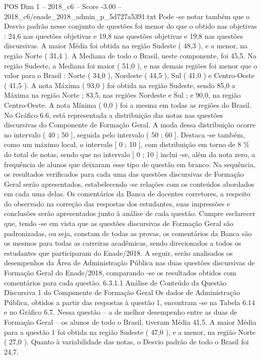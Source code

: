\begin{textsample}{POS Dim 1 – 2018\_c6 – Score -3.00 – 2018\_c6/enade\_2018\_admin\_p\_5d727a5391.txt}
Pode -se notar também que o Desvio padrão nesse conjunto de questões foi menor do que o obtido nas objetivas : 24,6 nas questões objetivas e 19,8 nas questões objetivas e 19,8 nas questões discursivas.
A maior Média foi obtida na região Sudeste ( 48,3 ), e a menor, na região Norte ( 31,4 ).
A Mediana de todo o Brasil, neste componente, foi 45,5.
Na região Sudeste, a Mediana foi maior ( 51,0 ), e nas demais regiões foi menor que o valor para o Brasil : Norte ( 34,0 ), Nordeste ( 44,5 ), Sul ( 41,0 ) e Centro-Oeste ( 41,5 ).
A nota Máxima ( 93,0 ) foi obtida na região Sudeste, sendo 85,0 a Máxima na região Norte ; 83,5, nas regiões Nordeste e Sul ; e 90,0, na região Centro-Oeste.
A nota Mínima ( 0,0 ) foi a mesma em todas as regiões do Brasil.
No Gráfico 6.6, está representada a distribuição das notas nas questões discursivas do Componente de Formação Geral.
A moda dessa distribuição ocorre no intervalo ( 40 ; 50 ], seguida pelo intervalo ( 50 ; 60 ].
Destaca -se também, como um máximo local, o intervalo [ 0 ; 10 ], com distribuição em torno de 8 \% do total de notas, sendo que no intervalo [ 0 ; 10 ] inclui -se, além da nota zero, a frequência de alunos que deixaram esse tipo de questão em branco.
Na sequência, os resultados verificados para cada uma das questões discursivas de Formação Geral serão apresentados, estabelecendo -se relações com os conteúdos abordados em cada uma delas.
Os comentários da Banca de docentes corretores, a respeito do observado na correção das respostas dos estudantes, suas impressões e conclusões serão apresentados junto à análise de cada questão.
Cumpre esclarecer que, tendo -se em vista que as questões discursivas de Formação Geral são padronizadas, ou seja, constam de todas as provas, os comentários da Banca são os mesmos para todas as carreiras acadêmicas, sendo direcionados a todos os estudantes que participaram do Enade/2018.
A seguir, serão analisados os desempenhos da Área de Administração Pública nas duas questões discursivas de Formação Geral do Enade/2018, comparando -se os resultados obtidos com comentários para cada questão. 6.3.1.1 Análise de Conteúdo da Questão Discursiva 1 do Componente de Formação Geral Os dados de Administração Pública, obtidos a partir das respostas à questão 1, encontram -se na Tabela 6.14 e no Gráfico 6.7.
Nessa questão – a de melhor desempenho entre as duas de Formação Geral – os alunos de todo o Brasil, tiveram Média 41,5.
A maior Média para a questão 1 foi obtida na região Sudeste ( 47,0 ), e a menor, na região Norte ( 27,0 ).
Quanto à variabilidade das notas, o Desvio padrão de todo o Brasil foi 24,7.

\end{textsample}
